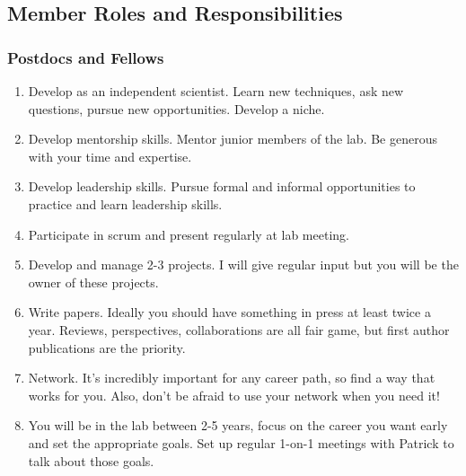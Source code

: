 \documentclass[10pt, letterpaper, twocolumn]{article} %
\begin{document}
\subsection{Member Roles and Responsibilities}

\subsubsection{Postdocs and Fellows}
\begin{enumerate}
\item Develop as an independent scientist. Learn new techniques, ask new questions, pursue new opportunities. Develop a niche.
\item Develop mentorship skills. Mentor junior members of the lab. Be generous with your time and expertise.
\item Develop leadership skills. Pursue formal and informal opportunities to practice and learn leadership skills.
\item Participate in scrum and present regularly at lab meeting.
\item Develop and manage 2-3 projects. I will give regular input but you will be the owner of these projects.
\item Write papers. Ideally you should have something in press at least twice a year. Reviews, perspectives, collaborations are all fair game, but first author publications are the priority.
\item Network. It's incredibly important for any career path, so find a way that works for you. Also, don't be afraid to use your network when you need it!
\item You will be in the lab between 2-5 years, focus on the career you want early and set the appropriate goals. Set up regular 1-on-1 meetings with Patrick to talk about those goals.
\end{enumerate}
\end{document}
